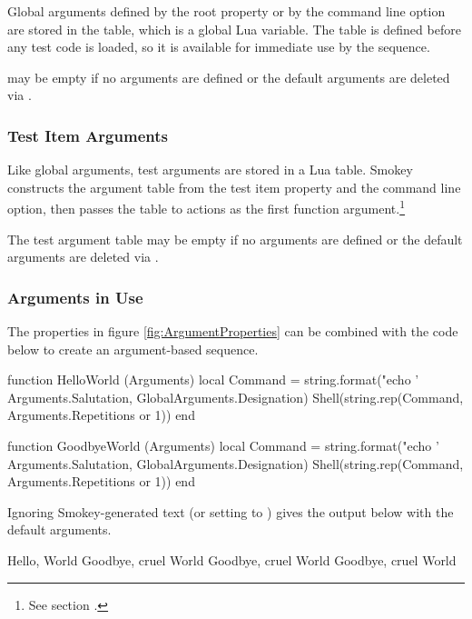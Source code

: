Global arguments defined by the  root property or by the
 command line option are stored in the
 table, which is a global Lua variable.  The table is
defined before any test code is loaded, so it is available for immediate use by
the sequence.

 may be empty if no arguments are defined or the default
arguments are deleted via .

\subsubsection{Test Item Arguments}
\label{sec:TestItemArguments}

Like global arguments, test arguments are stored in a Lua table.  Smokey
constructs the argument table from the  test item property and
the  command line option, then
passes the table to actions as the first function argument.\footnote{See
section .}

The test argument table may be empty if no arguments are defined or the default
arguments are deleted via .

\subsubsection{Arguments in Use}

The properties in figure \ref{fig:ArgumentProperties} can be combined with the
code below to create an argument-based sequence.

\begin{LuaCode}[linewidth=4.5in]
function HelloWorld (Arguments)
	local Command =
		string.format("echo '%
			Arguments.Salutation,
			GlobalArguments.Designation)
	Shell(string.rep(Command, Arguments.Repetitions or 1))
end

function GoodbyeWorld (Arguments)
	local Command =
		string.format("echo '%
			Arguments.Salutation,
			GlobalArguments.Designation)
	Shell(string.rep(Command, Arguments.Repetitions or 1))
end
\end{LuaCode}

Ignoring Smokey-generated text (or setting  to
) gives the output below with the default arguments.

\begin{TerminalOutput}
Hello, World
Goodbye, cruel World
Goodbye, cruel World
Goodbye, cruel World
\end{TerminalOutput}


